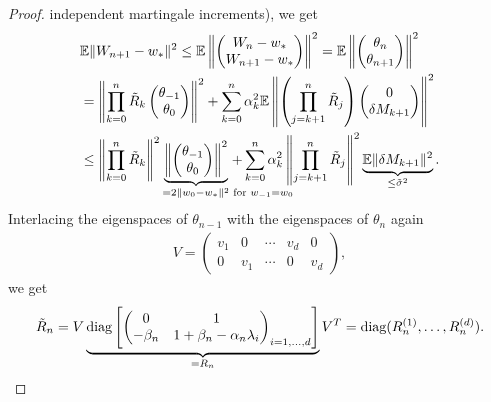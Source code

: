 \begin{proof}
	independent martingale increments), we get
	\begin{align}
		\nonumber
		&\E\|\Weights_{n+1} - \minimum\|^2
		\le \E\left\|\begin{pmatrix}
			\Weights_n - \minimum \\
			\Weights_{n+1} - \minimum
		\end{pmatrix}\right\|^2
		=\E\left\|\begin{pmatrix}
			\theta_n \\
			\theta_{n+1}
		\end{pmatrix}\right\|^2\\
		\nonumber
		&= \left\|\prod_{k=0}^n \tilde{\momMatrix}_k
		\begin{pmatrix}
			\theta_{-1}\\
			\theta_0
		\end{pmatrix}\right\|^2
		+ \sum_{k=0}^n \lrSq_k^2 \E\left\|\left(\prod_{j=k+1}^n \tilde{\momMatrix}_j\right)
		\begin{pmatrix}
			0\\
			\martIncr_{k+1}
		\end{pmatrix}\right\|^2\\
		\label{eq: mom recursion upper bound}
		&\le \left\|\prod_{k=0}^n \tilde{\momMatrix}_k\right\|^2
		\underbrace{\left\|\begin{pmatrix}
			\theta_{-1}\\
			\theta_0
		\end{pmatrix}\right\|^2}_{=2\|\weights_0-\minimum\|^2 \mathrlap{\text{ for } \weights_{-1}=\weights_0}}
		+ \sum_{k=0}^n \lrSq_k^2 \left\|\prod_{j=k+1}^n \tilde{\momMatrix}_j\right\|^2
		\underbrace{\E\|\martIncr_{k+1}\|^2}_{\le \tilde{\stdBound}^2}.
	\end{align}
	Interlacing the eigenspaces of \(\theta_{n-1}\) with the eigenspaces of
	\(\theta_n\) again
	\begin{align*}
		V = \begin{pmatrix}
			v_1 & 0 & \cdots & v_d & 0 \\
			0 & v_1 & \cdots & 0 & v_d
		\end{pmatrix},
	\end{align*}
	we get
	\begin{align*}
		\tilde{\momMatrix}_n
		= V \underbrace{\diag\left[\begin{pmatrix}
			0 & 1 \\
			-\momCoeff_n & 1+\momCoeff_n - \lrSq_n\hesseEV_i	
		\end{pmatrix}_{i=1,\dots,\dimension}\right]}_{=\momMatrix_n}V^T
		= \diag(R_n^{(1)}, \dots, R_n^{(\dimension)}).

\end{align*}
\end{proof}
